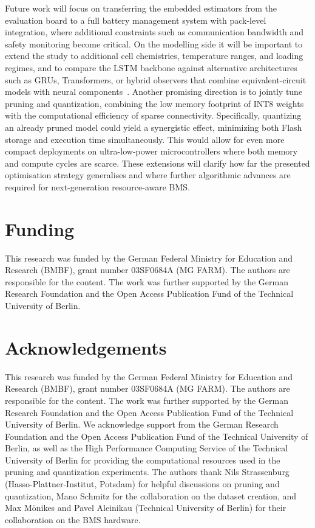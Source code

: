\documentclass[final,3p,times]{elsarticle}
\begin{document}
Future work will focus on transferring the embedded estimators from the evaluation board to a full battery management system with pack-level integration, where additional constraints such as communication bandwidth and safety monitoring become critical. On the modelling side it will be important to extend the study to additional cell chemistries, temperature ranges, and loading regimes, and to compare the LSTM backbone against alternative architectures such as GRUs, Transformers, or hybrid observers that combine equivalent-circuit models with neural components~\cite{liptonCriticalReviewRecurrent2015,singhDeepMachineLearning2024,gaoEnhancedStateofchargeEstimation2022,wangFusionEstimationLithiumion2022}. Another promising direction is to jointly tune pruning and quantization, combining the low memory footprint of INT8 weights with the computational efficiency of sparse connectivity. Specifically, quantizing an already pruned model could yield a synergistic effect, minimizing both Flash storage and execution time simultaneously. This would allow for even more compact deployments on ultra-low-power microcontrollers where both memory and compute cycles are scarce. These extensions will clarify how far the presented optimisation strategy generalises and where further algorithmic advances are required for next-generation resource-aware BMS.
\section*{Funding}
This research was funded by the German Federal Ministry for Education and Research (BMBF), grant number 03SF0684A (MG FARM). The authors are responsible for the content. The work was further supported by the German Research Foundation and the Open Access Publication Fund of the Technical University of Berlin.
\section*{Acknowledgements}
This research was funded by the German Federal Ministry for Education and Research (BMBF), grant number 03SF0684A (MG FARM). The authors are responsible for the content. The work was further supported by the German Research Foundation and the Open Access Publication Fund of the Technical University of Berlin.
We acknowledge support from the German Research Foundation and the Open Access Publication Fund of the Technical University of Berlin, as well as the High Performance Computing Service of the Technical University of Berlin for providing the computational resources used in the pruning and quantization experiments. The authors thank Nils Strassenburg (Hasso-Plattner-Institut, Potsdam) for helpful discussions on pruning and quantization, Mano Schmitz for the collaboration on the dataset creation, and Max Mönikes and Pavel Aleinikau (Technical University of Berlin) for their collaboration on the BMS hardware.
\end{document}

